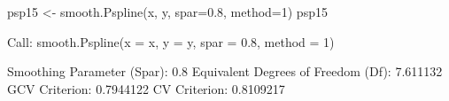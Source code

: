 \begin{Schunk}
\begin{Sinput}
 psp15 <- smooth.Pspline(x, y, spar=0.8, method=1)
 psp15
\end{Sinput}
\begin{Soutput}
Call:
smooth.Pspline(x = x, y = y, spar = 0.8, method = 1)

Smoothing Parameter (Spar): 0.8 
Equivalent Degrees of Freedom (Df): 7.611132 
GCV Criterion: 0.7944122 
CV  Criterion: 0.8109217 
\end{Soutput}
\end{Schunk}
